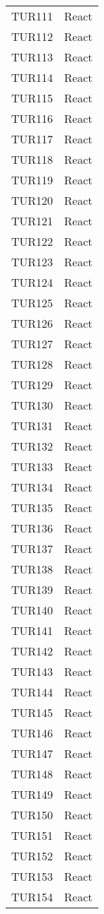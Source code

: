 \documentclass[PianoDiQualifica.tex]{subfiles}
\begin{document}
\begin{longtable}[H]{P{5cm}P{9cm}}
	TUR111 & React \\ 
	TUR112 & React \\ 
	TUR113 & React \\ 
	TUR114 & React \\ 
	TUR115 & React \\ 
	TUR116 & React \\ 
	TUR117 & React \\ 
	TUR118 & React \\ 
	TUR119 & React \\ 
	TUR120 & React \\ 
	TUR121 & React \\ 
	TUR122 & React \\ 
	TUR123 & React \\ 
	TUR124 & React \\ 
	TUR125 & React \\ 
	TUR126 & React \\ 
	TUR127 & React \\ 
	TUR128 & React \\ 
	TUR129 & React \\ 
	TUR130 & React \\ 
	TUR131 & React \\ 
	TUR132 & React \\ 
	TUR133 & React \\ 
	TUR134 & React \\ 
	TUR135 & React \\ 
	TUR136 & React \\ 
	TUR137 & React \\ 
	TUR138 & React \\ 
	TUR139 & React \\ 
	TUR140 & React \\ 
	TUR141 & React \\ 
	TUR142 & React \\ 
	TUR143 & React \\ 
	TUR144 & React \\ 
	TUR145 & React \\ 
	TUR146 & React \\ 
	TUR147 & React \\ 
	TUR148 & React \\ 
	TUR149 & React \\ 
	TUR150 & React \\ 
	TUR151 & React \\ 
	TUR152 & React \\ 
	TUR153 & React \\ 
	TUR154 & React \\ 

\end{longtable}
\end{document}
